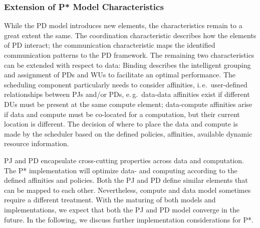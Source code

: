 \documentclass[conference,final]{IEEEtran}
\newcommand{\jhanote}[1]{ {\textcolor{red} { ***shantenu: #1 }}}
\newcommand{\alnote}[1]{ {\textcolor{blue} { ***andre: #1 }}}
\newcommand{\alnote}[1]{}
\newcommand{\jhanote}[1]{}
\begin{document}

\subsubsection*{Extension of P* Model Characteristics}


While the PD model introduces new elements, the characteristics remain
to a great extent the same. The coordination characteristic describes
how the elements of PD interact; the communication characteristic maps
the identified communication patterns to the PD framework. The
remaining two characteristics can be extended with respect to data:
Binding describes the intelligent grouping and assignment of PDs and
WUs to facilitate an optimal performance. The scheduling component particularly
needs to consider affinities, i.\,e.\ user-defined relationships
between PJs and/or PDs, e.\,g.\ data-data affinities exist if
different DUs must be present at the same compute element; data-compute
affinities arise if data and compute must be co-located for a
computation, but their current location is different. The decision of
where to place the data and compute is made by the scheduler based on
the defined policies, affinities, available dynamic resource
information.


PJ and PD encapsulate cross-cutting properties across data and
computation. The P* implementation will optimize data- and computing
according to the defined affinities and policies. Both the PJ and PD
define similar elements that can be mapped to each
other. Nevertheless, compute and data model sometimes require a
different treatment. With the maturing of both models and
implementations, we expect that both the PJ and PD model converge in
the future. In the following, we discuss further implementation
considerations for P*.
\end{document}
